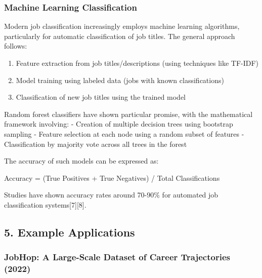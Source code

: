 \documentclass[
  letterpaper,
  DIV=11,
  numbers=noendperiod]{scrartcl}
\providecommand{\tightlist}{%
  \setlength{\itemsep}{0pt}\setlength{\parskip}{0pt}}
\begin{document}
\subsubsection{Machine Learning
Classification}\label{machine-learning-classification}

Modern job classification increasingly employs machine learning
algorithms, particularly for automatic classification of job titles. The
general approach follows:

\begin{enumerate}
\def\labelenumi{\arabic{enumi}.}
\tightlist
\item
  Feature extraction from job titles/descriptions (using techniques like
  TF-IDF)
\item
  Model training using labeled data (jobs with known classifications)
\item
  Classification of new job titles using the trained model
\end{enumerate}

Random forest classifiers have shown particular promise, with the
mathematical framework involving: - Creation of multiple decision trees
using bootstrap sampling - Feature selection at each node using a random
subset of features - Classification by majority vote across all trees in
the forest

The accuracy of such models can be expressed as:

Accuracy = (True Positives + True Negatives) / Total Classifications

Studies have shown accuracy rates around 70-90\% for automated job
classification systems{[}7{]}{[}8{]}.

\subsection{5. Example Applications}\label{example-applications}

\subsubsection{JobHop: A Large-Scale Dataset of Career Trajectories
(2022)}\label{jobhop-a-large-scale-dataset-of-career-trajectories-2022}
\end{document}
